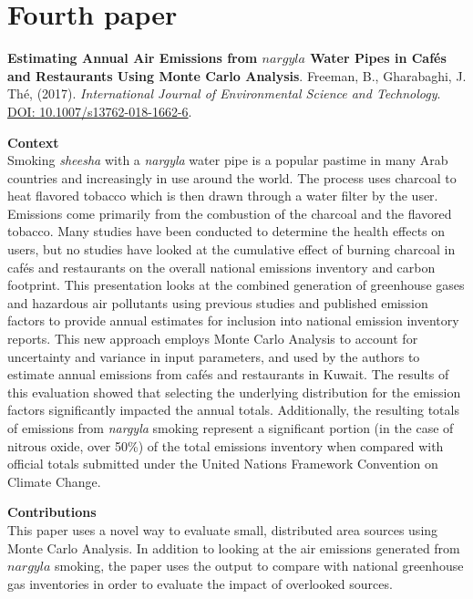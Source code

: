 \section{Fourth paper}
\noindent
\textbf{Estimating Annual Air Emissions from $nargyla$ Water Pipes in Caf\'es and Restaurants Using Monte Carlo Analysis}. Freeman, B., Gharabaghi, J.  Th\'e, (2017). \textit{International Journal of Environmental Science and Technology}. \url{DOI: 10.1007/s13762-018-1662-6}.

\vspace{5mm}
\noindent
\textbf{Context}\\
\noindent
Smoking \textit{sheesha} with a \textit{nargyla} water pipe is a popular pastime in many Arab countries and increasingly in use around the world.  The process uses charcoal to heat flavored tobacco which is then drawn through a water filter by the user.  Emissions come primarily from the combustion of the charcoal and the flavored tobacco.  Many studies have been conducted to determine the health effects on users, but no studies have looked at the cumulative effect of burning charcoal in caf\'es and restaurants on the overall national emissions inventory and carbon footprint.  This presentation looks at the combined generation of greenhouse gases and hazardous air pollutants using previous studies and published emission factors to provide annual estimates for inclusion into national emission inventory reports.  This new approach employs Monte Carlo Analysis to account for uncertainty and variance in input parameters, and used by the authors to estimate annual emissions from cafés and restaurants in Kuwait.  The results of this evaluation showed that selecting the underlying distribution for the emission factors significantly impacted the annual totals.  Additionally, the resulting totals of emissions from \textit{nargyla} smoking represent a significant portion (in the case of nitrous oxide, over 50\%) of the total emissions inventory when compared with official totals submitted under the United Nations Framework Convention on Climate Change.

\vspace{5mm}
\noindent
\textbf{Contributions}\\
\noindent
This paper uses a novel way to evaluate small, distributed area sources using Monte Carlo Analysis. In addition to looking at the air emissions generated from $nargyla$ smoking, the paper uses the output to compare with national greenhouse gas inventories in order to evaluate the impact of overlooked sources.

